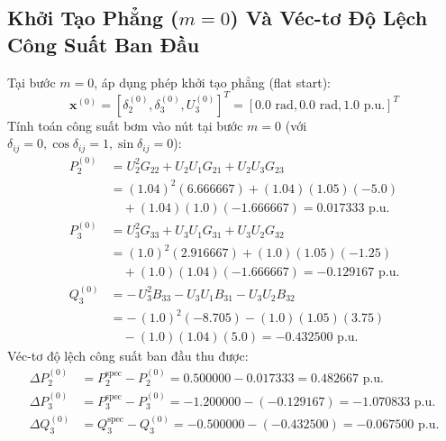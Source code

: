 \documentclass[12pt,a4paper,oneside]{report}
\begin{document}
\subsection{Khởi Tạo Phẳng ($m = 0$) Và Véc-tơ Độ Lệch Công Suất Ban Đầu}
Tại bước $m = 0$, áp dụng phép khởi tạo phẳng (flat start):
\begin{equation}
\mathbf{x}^{(0)} = [\delta_2^{(0)}, \delta_3^{(0)}, U_3^{(0)}]^T = [0.0\text{ rad}, 0.0\text{ rad}, 1.0\text{ p.u.}]^T
\end{equation}
Tính toán công suất bơm vào nút tại bước $m = 0$ (với $\delta_{ij} = 0, \cos\delta_{ij} = 1, \sin\delta_{ij} = 0$):
\begin{align}
P_2^{(0)} &= U_2^2 G_{22} + U_2 U_1 G_{21} + U_2 U_3 G_{23} \nonumber \\
&= (1.04)^2 (6.666667) + (1.04)(1.05)(-5.0) \nonumber \\
&\quad + (1.04)(1.0)(-1.666667) = 0.017333\text{ p.u.} \\
P_3^{(0)} &= U_3^2 G_{33} + U_3 U_1 G_{31} + U_3 U_2 G_{32} \nonumber \\
&= (1.0)^2 (2.916667) + (1.0)(1.05)(-1.25) \nonumber \\
&\quad + (1.0)(1.04)(-1.666667) = -0.129167\text{ p.u.} \\
Q_3^{(0)} &= -\, U_3^2 B_{33} - U_3 U_1 B_{31} - U_3 U_2 B_{32} \nonumber \\
&= -\, (1.0)^2 (-8.705) - (1.0)(1.05)(3.75) \nonumber \\
&\quad - (1.0)(1.04)(5.0) = -0.432500\text{ p.u.}
\end{align}
Véc-tơ độ lệch công suất ban đầu thu được:
\begin{align}
\Delta P_2^{(0)} &= P_2^{\text{spec}} - P_2^{(0)} = 0.500000 - 0.017333 = 0.482667\text{ p.u.} \\
\Delta P_3^{(0)} &= P_3^{\text{spec}} - P_3^{(0)} = -1.200000 - (-0.129167) = -1.070833\text{ p.u.} \\
\Delta Q_3^{(0)} &= Q_3^{\text{spec}} - Q_3^{(0)} = -0.500000 - (-0.432500) = -0.067500\text{ p.u.}
\end{align}
\end{document}
